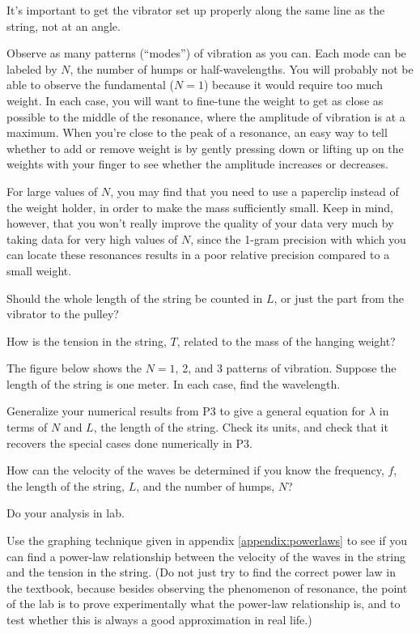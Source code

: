 It's important to get the vibrator set up properly along the
same line as the string, not at an angle.

\observations

Observe as many patterns (``modes'') of vibration as you can. Each mode
can be labeled by $N$, the number of humps or half-wavelengths.  You will
probably not be able to observe the fundamental ($N=1$)
because it would require too much weight.  In each
case, you will want to fine-tune the weight to get as close
as possible to the middle of the resonance, where the
amplitude of vibration is at a maximum.  When you're close
to the peak of a resonance, an easy way to tell whether to
add or remove weight is by gently pressing down or lifting
up on the weights with your finger to see whether the
amplitude increases or decreases.

For large values of $N$, you may find that you need to use a
paperclip instead of the weight holder, in order to make the mass
sufficiently small. Keep in mind, however, that you won't really
improve the quality of your data very much by taking data for very
high values of $N$, since the 1-gram precision with which you can
locate these resonances results in a poor relative precision
compared to a small weight.

\prelab

\prelabquestion  Should the whole length of the string be counted in
$L$, or just the part from the vibrator to the pulley?

\prelabquestion  How is the tension in the string, $T$, related to the
mass of the hanging weight?

\prelabquestion The figure below shows the $N=1$, 2, and 3 patterns
of vibration. Suppose the length of the string is one meter. In each case,
find the wavelength.


\prelabquestion Generalize your numerical results from P3 to give a general
equation for $\lambda$ in terms of $N$ and $L$, the length of the string. Check its units, and check
that it recovers the special cases done numerically in P3.

\prelabquestion  How can the velocity of the waves be determined if you
know the frequency, $f$, the length of the string, $L$, and
the number of humps, $N$?

\selfcheck

Do your analysis in lab.

\analysis

Use the graphing technique given in appendix \ref{appendix:powerlaws} to see if you can
find a power-law relationship between the velocity of the
waves in the string and the tension in the string.  (Do not
just try to find the correct power law in the textbook,
because besides observing the phenomenon of resonance, the
point of the lab is to prove experimentally what the
power-law relationship is, and to test whether this is
always a good approximation in real life.)

